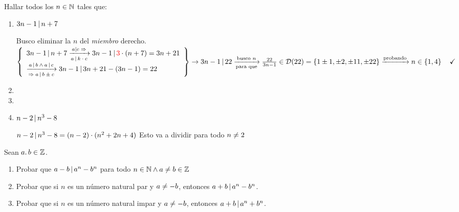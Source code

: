 \documentclass[12pt,a4paper, spanish]{article}
\begin{document}
\ejercicio
Hallar todos los $n \in \mathbb N$ tales que:
\begin{enumerate}[label=\roman*)]
	\item $3n - 1 \, | \, n+7$\\
	      \separadorCorto

	      Busco eliminar la $n$ del \textit{miembro} derecho.\\
	      $\llaves{l}{
			      3n - 1 \divide n + 7
			      \flecha{$a|c \entonces$}[$a \divide k\cdot c$]
			      3n - 1 \divide \red{3} \cdot (n+7) = 3n + 21\\
			      \flecha{$a \divide b \y a \divide c$}[$\entonces a \divide b \pm c$]
			      3n-1 \divide 3n + 21 - (3n -1) = 22
		      } \to 3n - 1 \divide 22\\
		      \flecha{busco $n$}[para que] \frac{22}{3n-1} \en \divset{22}{1\pm1, \pm2, \pm11, \pm22} \flecha{probando} n \en \set{1,4} \Tilde$
	\item
	\item

	\item $n-2 \, | \, n^3 - 8$

	      \separadorCorto

	      $n-2 \, | \, n^3 - 8 = (n-2) \cdot (n^2 + 2n + 4)$ Esto va a dividir para todo $n \neq 2$\\

\end{enumerate}

\ejercicio Sean $a.\,b \in \mathbb Z$.
\begin{enumerate}[label=\roman*)]
	\item Probar que $a-b \, | \, a^n - b^n$ para todo $n \in \mathbb N \land a \neq b \in \mathbb Z$
	\item Probar que si $n$ es un número natural par y $a \neq -b$, entonces $a+b \, | \, a^n - b^n$.
	\item Probar que si $n$ es un número natural impar y $a \neq -b$, entonces  $a+b \, | \, a^n + b^n$.
\end{enumerate}
\separadorCorto
\end{document}
